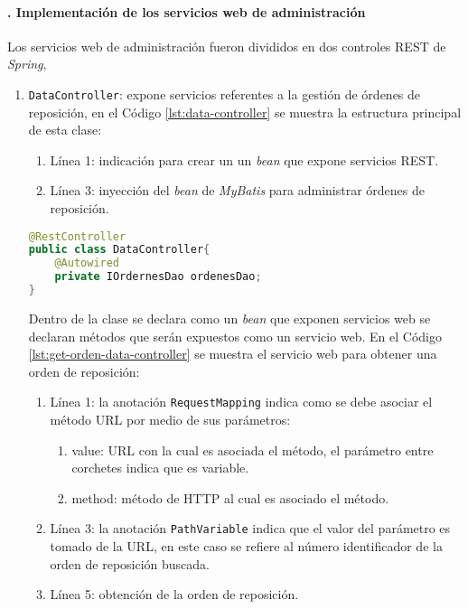 \paragraph{. Implementación de los servicios web de administración\\}
Los servicios web de administración fueron divididos en dos controles REST de \textit{Spring}, 
\begin{enumerate}
	\item \texttt{DataController}: expone servicios referentes a la gestión de órdenes de reposición, en el Código \ref{lst:data-controller} se muestra la estructura principal de esta clase:
	\begin{enumerate}
		\item Línea 1: indicación para crear un un \textit{bean} que expone servicios REST.
		\item Línea 3: inyección del \textit{bean} de \textit{MyBatis} para administrar órdenes de reposición.
	\end{enumerate}

\begin{lstlisting}[language=Java, caption={Controlador para exponer servicios web de órdenes de reposición.}, captionpos=b, label={lst:data-controller}]
@RestController
public class DataController{
	@Autowired
	private IOrdernesDao ordenesDao;
}
\end{lstlisting}

	Dentro de la clase se declara como un \textit{bean} que exponen servicios web se declaran métodos que serán expuestos como un servicio web. En el Código \ref{lst:get-orden-data-controller} se muestra el servicio web para obtener una orden de reposición:
	\begin{enumerate}
		\item Línea 1: la anotación \texttt{RequestMapping} indica como se debe asociar el método URL por medio de sus parámetros:
		\begin{enumerate}
			\item value: URL con la cual es asociada el método, el parámetro entre corchetes indica que es variable.
			\item method: método de HTTP al cual es asociado el método. 
		\end{enumerate}
		\item Línea 3: la anotación \texttt{PathVariable} indica que el valor del parámetro es tomado de la URL, en este caso se refiere al número identificador de la orden de reposición buscada.
		\item Línea 5: obtención de la orden de reposición.
	\end{enumerate}


\end{enumerate}
